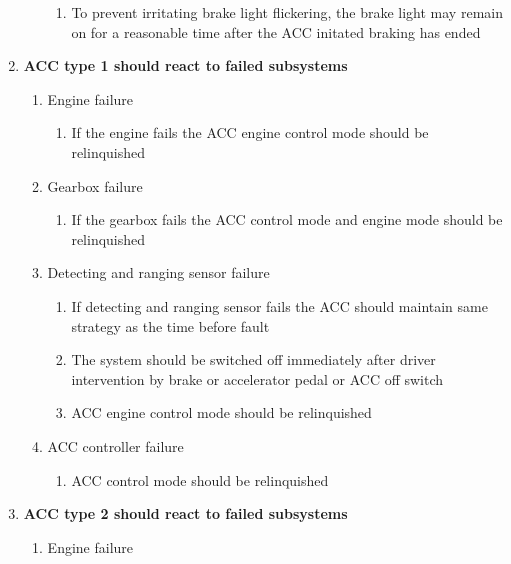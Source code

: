 \begin{enumerate}
\begin{enumerate}[label*=\arabic*]
\begin{enumerate}[label*=\arabic*]
            \item {To prevent irritating brake light flickering, the brake light may remain on for a reasonable time after the ACC initated braking has ended}
        \end{enumerate}
    \end{enumerate}   
    \item{\bf ACC type 1 should react to failed subsystems}
    \begin{enumerate}[label*=\arabic*]
        \item{Engine failure}
        \begin{enumerate}[label*=\arabic*]
            \item{If the engine fails the ACC engine control mode should be relinquished}    
        \end{enumerate}
        \item{Gearbox failure}
        \begin{enumerate}[label*=\arabic*]
            \item{If the gearbox fails the ACC control mode and engine mode should be relinquished}    
        \end{enumerate}
        \item{Detecting and ranging sensor failure}
        \begin{enumerate}[label*=\arabic*]
            \item{If detecting and ranging sensor fails the ACC should maintain same strategy as the time before fault}
            \item{The system should be switched off immediately after driver intervention by brake or accelerator pedal or ACC off switch}
            \item{ACC engine control mode should be relinquished}
        \end{enumerate}
        \item{ACC controller failure}
        \begin{enumerate}[label*=\arabic*]
            \item{ACC control mode should be relinquished}
        \end{enumerate}
    \end{enumerate}
    \item{\bf ACC type 2 should react to failed subsystems}
    \begin{enumerate}[label*=\arabic*]
       \item{Engine failure}
       \begin{enumerate}[label*=\arabic*]

\end{enumerate}
\end{enumerate}
\end{enumerate}

